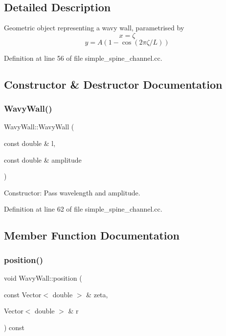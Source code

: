 \subsection{Detailed Description}
Geometric object representing a wavy wall, parametrised by \[ x = \zeta \] \[ y = A (1 - \cos(2\pi\zeta/L) )\] 

Definition at line 56 of file simple\+\_\+spine\+\_\+channel.\+cc.



\subsection{Constructor \& Destructor Documentation}
\mbox{\label{classWavyWall_a7ef7a36cbce8798c1e4a99165dee8cc0}} 
\subsubsection{\texorpdfstring{Wavy\+Wall()}{WavyWall()}}
{\footnotesize\ttfamily Wavy\+Wall\+::\+Wavy\+Wall (\begin{DoxyParamCaption}\item[{const double \&}]{l,  }\item[{const double \&}]{amplitude }\end{DoxyParamCaption})\hspace{0.3cm}{\ttfamily [inline]}}



Constructor\+: Pass wavelength and amplitude. 



Definition at line 62 of file simple\+\_\+spine\+\_\+channel.\+cc.



\subsection{Member Function Documentation}
\mbox{\label{classWavyWall_a9a9f5a98cb0d15ee801b52495be5e5bf}} 
\subsubsection{\texorpdfstring{position()}{position()}}
{\footnotesize\ttfamily void Wavy\+Wall\+::position (\begin{DoxyParamCaption}\item[{const Vector$<$ double $>$ \&}]{zeta,  }\item[{Vector$<$ double $>$ \&}]{r }\end{DoxyParamCaption}) const\hspace{0.3cm}{\ttfamily [inline]}}



